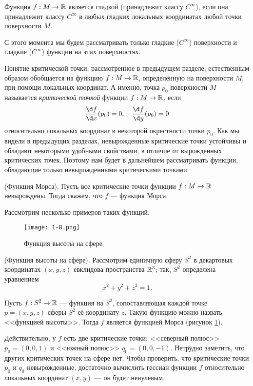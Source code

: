 \documentclass[a4paper,12pt,openany,leqno]{extbook}
\begin{document}
Функция $f:M \to \mathbb{R}$ является гладкой (принадлежит классу $C^{\infty}$), если она принадлежит классу $C^{\infty}$ в любых гладких локальных координатах любой точки поверхности $M$.

С этого момента мы будем рассматривать только гладкие ($C^{\infty}$) поверхности и гладкие ($C^{\infty}$) функции на этих поверхностях.

Понятие критической точки, рассмотренное в предыдущем разделе, естественным образом обобщается на функцию $f:M \to \mathbb{R}$, определённую на поверхности $M$, при помощи локальных координат. А именно, точка $p_0$ поверхности $M$ называется \emph{критической точкой} функции $f:M \to \mathbb{R}$, если
\begin{equation}
\frac{\d f}{\d x}(p_0) = 0,\quad \frac{\d f}{\d y}(p_0) = 0
\label{eq:crit_point_surface}
\end{equation}
относительно локальных координат в некоторой окрестности точки $p_0$. Как мы видели в предыдущих разделах, невырожденные критические точки устойчивы и обладают некоторыми удобными свойствами, в отличие от вырожденных критических точек. Поэтому нам будет в дальнейшем рассматривать функции, обладающие только невырожденными критическими точками.

\begin{definition} (Функция Морса). Пусть все критические точки функции $f:M \to \mathbb{R}$ невырождены. Тогда скажем, что $f$ --- функция Морса.
\end{definition}

Рассмотрим несколько примеров таких функций.
    
\begin{figure}[ht]
\texttt{[image: 1-8.png]}
\caption{Функция высоты на сфере}
\label{fig:sphere_height_function}
\end{figure}

\begin{example}(Функция высоты на сфере). Рассмотрим единичную сферу $S^2$ в декартовых координатах $(x, y, z)$ евклидова пространства $\mathbb{R}^3$; так, $S^2$ определена уравнением
\begin{equation}
x^2 + y^2 + z^2 = 1.
\end{equation}

Пусть $f:S^2 \to \mathbb{R}$ --- функция на $S^2$, сопоставляющая каждой точке $p = (x, y, z)$ сферы $S^2$ её координату $z$. Такую функцию можно назвать <<функцией высоты>>. Тогда $f$ является функцией Морса (рисунок \ref{fig:sphere_height_function}).

Действительно, у $f$ есть две критические точки: <<северный полюс>> $p_0 = (0, 0, 1)$ и <<южный полюс>> $q_0 = (0, 0, -1)$. Нетрудно заметить, что других критических точек на сфере нет. Чтобы проверить, что критические точки $p_0$ и $q_0$ невырожденные, достаточно вычислить гессиан функции $f$ относительно локальных координат $(x, y)$ --- он будет ненулевым.
\end{example}
\end{document}

